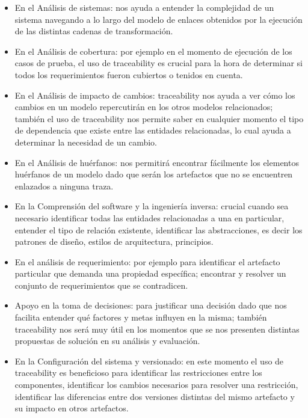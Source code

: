 \documentclass[a4paper,12pt,oneside]{book}
\begin{document}
\begin{itemize}

\item   En el Análisis de sistemas: nos ayuda a entender la complejidad de un sistema navegando a lo largo del modelo de enlaces obtenidos por la ejecución de las distintas cadenas de transformación.   

\item    En el Análisis de cobertura: por ejemplo en el momento de ejecución de los casos de prueba, el uso de traceability es crucial para la hora de determinar si todos los requerimientos fueron cubiertos o tenidos en cuenta.

 \item   En el Análisis de impacto de cambios: traceability nos ayuda a ver cómo los cambios en un modelo repercutirán en los otros modelos relacionados; también el uso de traceability nos permite saber en cualquier momento el tipo de dependencia que existe entre las entidades relacionadas, lo cual ayuda a determinar la necesidad de un cambio.

 \item   En el Análisis de huérfanos: nos permitirá encontrar fácilmente los elementos huérfanos de un modelo dado que serán los artefactos que no se encuentren enlazados a ninguna traza.

 \item   En la Comprensión del software y la ingeniería inversa: crucial cuando sea necesario identificar todas las entidades relacionadas a una en particular, entender el tipo de relación existente, identificar las abstracciones, es decir los patrones de diseño, estilos de arquitectura, principios.

 \item   En el análisis de requerimiento: por ejemplo para identificar el artefacto particular que demanda una propiedad específica; encontrar y resolver un conjunto de requerimientos que se contradicen.

 \item   Apoyo en la toma de decisiones: para justificar una decisión dado que nos facilita entender qué factores y metas influyen en la misma; también traceability nos será muy útil en los momentos que se nos presenten distintas propuestas de solución en su análisis y evaluación.

\item    En la Configuración del sistema y versionado: en este momento el uso de traceability es beneficioso para identificar las restricciones entre los componentes, identificar los cambios necesarios para resolver una restricción, identificar las diferencias entre dos versiones distintas del mismo artefacto y su impacto en otros artefactos.

\end{itemize}
\end{document}
